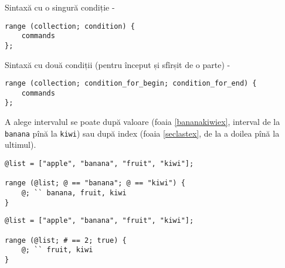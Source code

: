 Sintaxă cu o singură condiție -
\begin{verbatim}
range (collection; condition) {
	commands
};
\end{verbatim}

Sintaxă cu două condiții (pentru început și sfîrșit de o parte) -
\begin{verbatim}
range (collection; condition_for_begin; condition_for_end) {
	commands
};
\end{verbatim}

A alege intervalul se poate după valoare (foaia \ref{bananakiwiex}, interval de la \texttt{banana} pînă la \texttt{kiwi}) sau după index (foaia \ref{seclastex}, de la a doilea pînă la ultimul).

\begin{sourcecode}
\label{bananakiwiex}
\begin{verbatim}
@list = ["apple", "banana", "fruit", "kiwi"];

range (@list; @ == "banana"; @ == "kiwi") {
	@; `` banana, fruit, kiwi
}
\end{verbatim}
\end{sourcecode}

\begin{sourcecode}
\label{seclastex}
\begin{verbatim}
@list = ["apple", "banana", "fruit", "kiwi"];

range (@list; # == 2; true) {
	@; `` fruit, kiwi
}
\end{verbatim}
\end{sourcecode}

